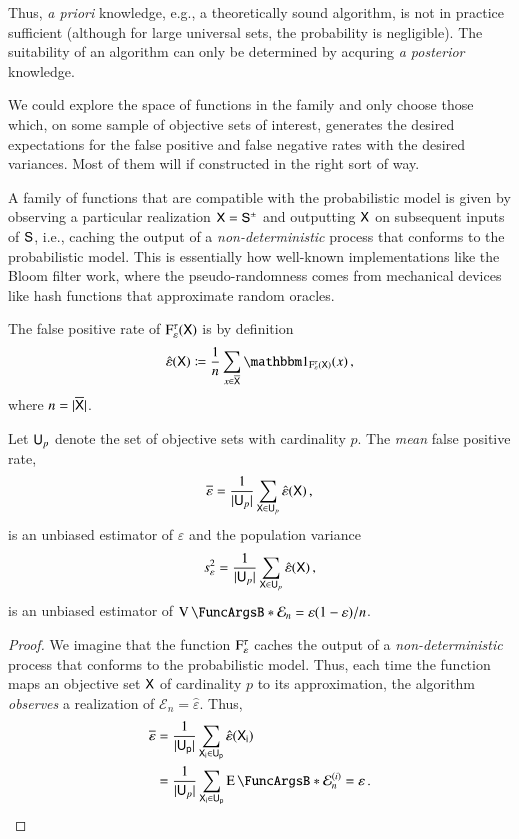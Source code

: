 \documentclass[10pt,final,hidelinks]{article}
\numberwithin{equation}{section}
\newcommand{\SetIndicator}[1]{\BlackboardSet{1}_{#1}}
\DeclarePairedDelimiter\Card{\lvert}{\rvert}
\newcommand{\p}{p}
\newcommand{\n}{n}
\newcommand{\FPR}{\mathcal{E}}
\newcommand{\tprate}{\tau}
\newcommand{\fprate}{\varepsilon}
\newcommand{\fprateob}{\hat{\fprate}}
\theoremstyle{plain}
\begin{document}
Thus, \emph{a priori} knowledge, e.g., a theoretically sound algorithm, is not in practice sufficient (although for large universal sets, the probability is negligible).
The suitability of an algorithm can only be determined by acquring \emph{a posterior} knowledge.

We could explore the space of functions in the family and only choose those which, on some sample of objective sets of interest, generates the desired expectations for the false positive and false negative rates with the desired variances.
Most of them will if constructed in the right sort of way.

A family of functions that are compatible with the probabilistic model is given by observing a particular realization $\Set{X} = \ASet{S}$ and outputting 
$\Set{X}$ on subsequent inputs of $\Set{S}$, i.e., caching the output of a \emph{non-deterministic} process that conforms to the probabilistic model.
This is essentially how well-known implementations like the Bloom filter work, where the pseudo-randomness comes from mechanical devices like hash functions that approximate random oracles.

The false positive rate of $\ctor{\fprate}{\tprate}(\Set{X})$ is by definition
\begin{equation}
    \fprateob(\Set{X}) \coloneqq \frac{1}{\n} \sum_{x \in \SetComplement[\Set{X}]} \SetIndicator{\ctor{\fprate}{\tprate}(\Set{X})}(x)\,,
\end{equation}
where $\n = \Card{\SetComplement[\Set{X}]}$.

Let $\Set{U}_p$ denote the set of objective sets with cardinality $\p$.
The \emph{mean} false positive rate,
\begin{equation}
    \overline{\fprate} = \frac{1}{\Card{\Set{U}_p}}
        \sum_{\Set{X} \in \Set{U}_p} \fprateob(\Set{X})\,,
\end{equation}
is an unbiased estimator of $\fprate$ and the population variance
\begin{equation}
    s^2_\fprate = \frac{1}{\Card{\Set{U}_p}}
        \sum_{\Set{X} \in \Set{U}_p} \fprateob(\Set{X})\,,
\end{equation}
is an unbiased estimator of $\Var{\FPR_\n} = \fprate(1-\fprate)/\n$.
\begin{proof}
We imagine that the function $\ctor{\fprate}{\tprate}$ caches the output of a \emph{non-deterministic} process that conforms to the probabilistic model.
Thus, each time the function maps an objective set $\Set{X}$ of cardinality $\p$ to its approximation, the algorithm \emph{observes} a realization of 
$\FPR_\n = \fprateob$.
Thus,
\begin{align}
    \overline{\fprate}
        &= \frac{1}{\Card{\Set{U}[p]}} 
            \sum_{\Set{X}[i] \in \Set{U}[p]} \fprateob(\Set{X}[i])\\
        &= \frac{1}{\Card{\Set{U}_p}} 
            \sum_{\Set{X}[i] \in \Set{U}[p]} \Expect{\FPR_\n^{(i)}} = \fprate\,.
\end{align}
\end{proof}
\end{document}
